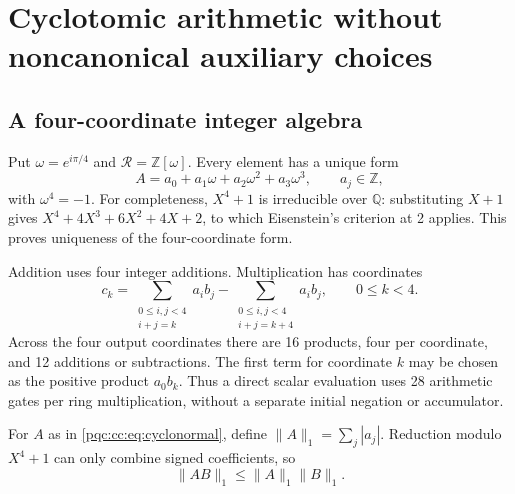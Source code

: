 \documentclass[11pt,letterpaper]{article}
\numberwithin{equation}{section}
\theoremstyle{definition}
\theoremstyle{remark}
\newcommand{\Z}{\mathbb Z}
\newcommand{\Q}{\mathbb Q}
\newcommand{\srcmark}[1]{\par\noindent{\small\itshape [source~#1]}\par}
\newcommand{\calR}{\mathcal R}
\begin{document}
\section{Cyclotomic arithmetic without noncanonical auxiliary choices}
\label{pqc:cc:sec:cyclotomic}
\srcmark{10}

\subsection{A four-coordinate integer algebra}

Put $\omega=e^{i\pi/4}$ and $\calR=\Z[\omega]$. Every element has a unique form
\begin{equation}
 A=a_0+a_1\omega+a_2\omega^2+a_3\omega^3,\qquad a_j\in\Z,
\label{pqc:cc:eq:cyclonormal}
\end{equation}
with $\omega^4=-1$. For completeness, $X^4+1$ is irreducible over $\Q$:
substituting $X+1$ gives $X^4+4X^3+6X^2+4X+2$, to which Eisenstein's criterion
at 2 applies. This proves uniqueness of the four-coordinate form.

Addition uses four integer additions. Multiplication has coordinates
\begin{equation}
 c_k=\sum_{\substack{0\le i,j<4\\i+j=k}}a_i b_j
       -\sum_{\substack{0\le i,j<4\\i+j=k+4}}a_i b_j,
 \qquad 0\le k<4.
\label{pqc:cc:eq:cyclomul}
\end{equation}
Across the four output coordinates there are 16 products, four per coordinate,
and 12 additions or subtractions. The first term for coordinate $k$ may be
chosen as the positive product $a_0b_k$. Thus a direct scalar evaluation uses
28 arithmetic gates per ring multiplication, without a separate initial
negation or accumulator.

For $A$ as in \eqref{pqc:cc:eq:cyclonormal}, define
$\|A\|_1=\sum_j|a_j|$. Reduction modulo $X^4+1$ can only combine signed
coefficients, so
\begin{equation}
 \|AB\|_1\le\|A\|_1\|B\|_1.
\label{pqc:cc:eq:l1submult}
\end{equation}
\end{document}
